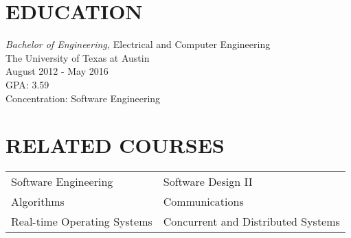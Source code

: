 \documentclass[line,margin]{res}
\begin{document}

\address{Phone: (512) 577-7517 Email: matthewzhan@utexas.edu}
\address{LinkedIn: \url{http://lnked.in/zhan}}

 
\begin{resume}
 
 
 
 
\section{EDUCATION} {\sl Bachelor of Engineering,} Electrical and Computer Engineering \\
			   The University of Texas at Austin \\
                August 2012 - May 2016 \\
                GPA: 3.59 \\
                Concentration: Software Engineering

                \section{RELATED COURSES}
                \iffalse
                \begin{tabular}{ l l }


                \end{tabular}
                \fi

                \begin{tabularx}{\textwidth}{@{}XX@{}}

                  Software Engineering & Software Design II \\

                  Algorithms & Communications \\

                  Real-time Operating Systems & Concurrent and Distributed Systems \\


\end{tabularx}
\end{resume}
\end{document}
